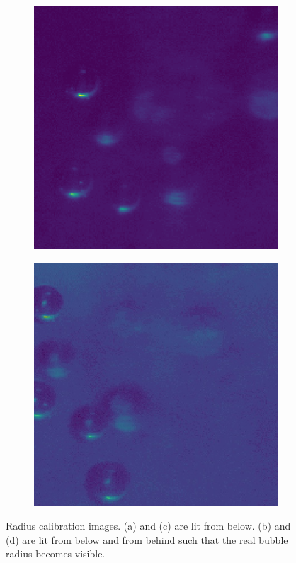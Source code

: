 \begin{figure}
				\begin{subfigure}[b]{.55\textwidth}
					\centering
					\includegraphics[scale=.3]{images/rad_calib_3_COLOR.png}
					\caption{}
				\end{subfigure}
				\begin{subfigure}[b]{.55\textwidth}
					\centering
					\includegraphics[scale=.3]{images/rad_calib_4_COLOR.jpg}
					\caption{}
				\end{subfigure}
				
				\caption{Radius calibration images. (a) and (c) are lit from below. (b) and (d) are lit from below and from behind such that the real bubble radius becomes visible. }
				\label{fig:radius_calibration_setup_result}
			\end{figure}

































